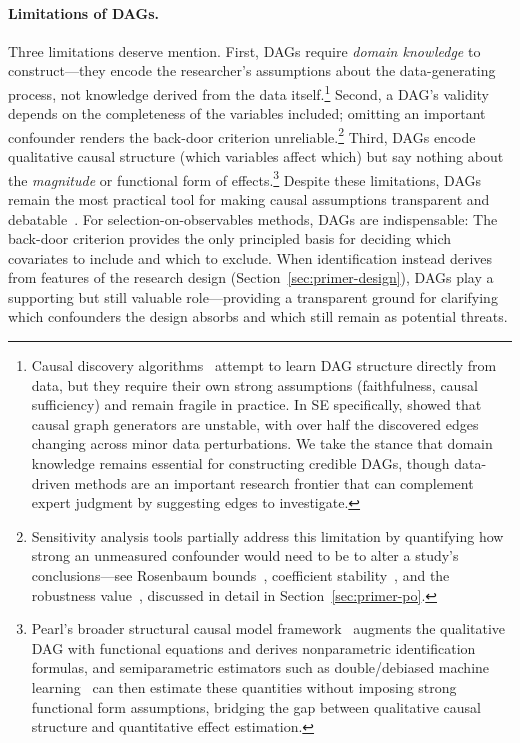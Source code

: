 \paragraph{Limitations of DAGs.}
Three limitations deserve mention.
First, DAGs require \emph{domain knowledge} to construct---they encode the researcher's assumptions about the data-generating process, not knowledge derived from the data itself.\footnote{Causal discovery algorithms~\cite{spirtes2001causation} attempt to learn DAG structure directly from data, but they require their own strong assumptions (faithfulness, causal sufficiency) and remain fragile in practice.
In SE specifically, \citet{journals/ese/HulseEM25} showed that causal graph generators are unstable, with over half the discovered edges changing across minor data perturbations.
We take the stance that domain knowledge remains essential for constructing credible DAGs, though data-driven methods are an important research frontier that can complement expert judgment by suggesting edges to investigate.}
Second, a DAG's validity depends on the completeness of the variables included; omitting an important confounder renders the back-door criterion unreliable.\footnote{Sensitivity analysis tools partially address this limitation by quantifying how strong an unmeasured confounder would need to be to alter a study's conclusions---see Rosenbaum bounds~\cite{rosenbaum2002observational}, coefficient stability~\cite{oster2019unobservable}, and the robustness value~\cite{cinelli2020making}, discussed in detail in Section~\ref{sec:primer-po}.}
Third, DAGs encode qualitative causal structure (which variables affect which) but say nothing about the \emph{magnitude} or functional form of effects.\footnote{Pearl's broader structural causal model framework~\cite{pearl2009causality} augments the qualitative DAG with functional equations and derives nonparametric identification formulas, and semiparametric estimators such as double/debiased machine learning~\cite{chernozhukov2018double} can then estimate these quantities without imposing strong functional form assumptions, bridging the gap between qualitative causal structure and quantitative effect estimation.}
Despite these limitations, DAGs remain the most practical tool for making causal assumptions transparent and debatable~\cite{rohrer2018thinking, tennant2021dags}.
For selection-on-observables methods, DAGs are indispensable: The back-door criterion provides the only principled basis for deciding which covariates to include and which to exclude.
When identification instead derives from features of the research design (Section~\ref{sec:primer-design}), DAGs play a supporting but still valuable role---providing a transparent ground for clarifying which confounders the design absorbs and which still remain as potential threats.

